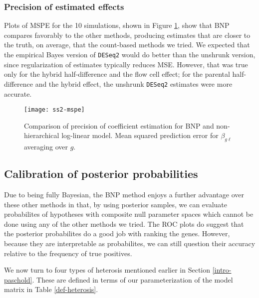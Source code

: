 \subsubsection{Precision of estimated effects}
Plots of MSPE for the 10 simulations, shown in Figure \ref{ss2-mspe}, show that BNP compares favorably to the other methods, producing estimates that are closer to the truth, on average, that the count-based methods we tried. We expected that the empirical Bayes version of \texttt{DESeq2} would do better than the unshrunk version, since regularization of estimates typically reduces MSE. However, that was true only for the hybrid half-difference and the flow cell effect; for the parental half-difference and the hybrid effect, the unshrunk \texttt{DESeq2} estimates were more accurate.

\begin{figure}[ht!]
\centering
\texttt{[image: ss2-mspe]}
\begin{minipage}{.8\textwidth}
\caption{\small Comparison of precision of coefficient estimation for BNP and non-hierarchical log-linear model. Mean squared prediction error for $\beta_{g\ell}$ averaging over $g$.}
\label{ss2-mspe}
\end{minipage}
\end{figure}

\subsection{Calibration of posterior probabilities}
Due to being fully Bayesian, the BNP method enjoys a further advantage over these other methods in that, by using posterior samples, we can evaluate probabilites of hypotheses with composite null parameter spaces which cannot be done using any of the other methods we tried. The ROC plots do suggest that the posterior probabilites do a good job with ranking the genes. However, because they are interpretable as probabilites, we can still question their accuracy relative to the frequency of true positives.

We now turn to four types of heterosis mentioned earlier in Section \ref{intro-paschold}. These are defined in terms of our parameterization of the model matrix in Table \ref{def-heterosis}.

